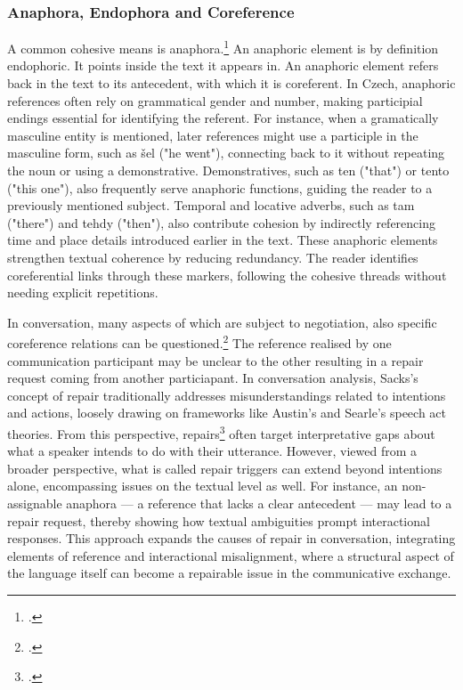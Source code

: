 \documentclass[12pt]{report}
\begin{document}
{\subsubsection{Anaphora, Endophora and Coreference}
\par
    A common cohesive means is anaphora.\footcite{Nedoluzhko2011}
        An anaphoric element is by definition endophoric.
        It points inside the text it appears in.
        An anaphoric element refers back in the text to its antecedent, with which it is coreferent.
    In Czech, anaphoric references often rely on grammatical gender and number,
    making participial endings essential for identifying the referent.
    For instance, when a gramatically masculine entity is mentioned,
    later references might use a participle in the masculine form, such as šel ("he went"),
    connecting back to it without repeating the noun or using a demonstrative.
    Demonstratives, such as ten ("that") or tento ("this one"),
    also frequently serve anaphoric functions, guiding the reader to a previously mentioned subject.
    Temporal and locative adverbs, such as tam ("there") and tehdy ("then"),
    also contribute cohesion by indirectly referencing time and place details introduced earlier in the text.
    These anaphoric elements strengthen textual coherence by reducing redundancy.
    The reader identifies coreferential links through these markers,
    following the cohesive threads without needing explicit repetitions.

\par
    In conversation, many aspects of which are subject to negotiation,
    also specific coreference relations can be questioned.\footcite{loaiciga2021reference}
    The reference realised by one communication participant may be unclear to the other
    resulting in a repair request coming from another particiapant.
    In conversation analysis,
    Sacks’s concept of repair traditionally addresses
    misunderstandings related to intentions and actions,
    loosely drawing on frameworks like Austin’s and Searle’s speech act theories.
    From this perspective, repairs\footcite{DINGEMANSE202430} often target interpretative gaps about
    what a speaker intends to do with their utterance.
    However, viewed from a broader perspective,
    what is called repair triggers can extend beyond intentions alone,
    encompassing issues on the textual level as well.
    For instance, an non-assignable anaphora —
    a reference that lacks a clear antecedent —
    may lead to a repair request,
    thereby showing how textual ambiguities prompt interactional responses.
    This approach expands the causes of repair in conversation,
    integrating elements of reference and interactional misalignment,
    where a structural aspect of the language itself can
    become a repairable issue in the communicative exchange.

}
\end{document}

